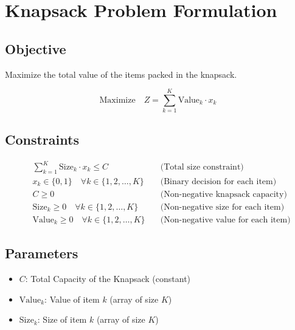 \documentclass{article}
\begin{document}
\section*{Knapsack Problem Formulation}

\subsection*{Objective}
Maximize the total value of the items packed in the knapsack.

\[
\text{Maximize} \quad Z = \sum_{k=1}^{K} \text{Value}_k \cdot x_k
\]

\subsection*{Constraints}
\begin{align}
& \sum_{k=1}^{K} \text{Size}_k \cdot x_k \leq C \quad & \text{(Total size constraint)} \\
& x_k \in \{0, 1\} \quad \forall k \in \{1, 2, \ldots, K\} \quad & \text{(Binary decision for each item)} \\
& C \geq 0 \quad & \text{(Non-negative knapsack capacity)} \\
& \text{Size}_k \geq 0 \quad \forall k \in \{1, 2, \ldots, K\} \quad & \text{(Non-negative size for each item)} \\
& \text{Value}_k \geq 0 \quad \forall k \in \{1, 2, \ldots, K\} \quad & \text{(Non-negative value for each item)}
\end{align}

\subsection*{Parameters}
\begin{itemize}
    \item $C$: Total Capacity of the Knapsack (constant)
    \item $\text{Value}_k$: Value of item $k$ (array of size $K$)
    \item $\text{Size}_k$: Size of item $k$ (array of size $K$)
\end{itemize}
\end{document}
